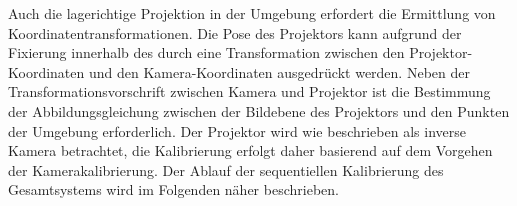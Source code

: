 Auch die lagerichtige Projektion in der Umgebung erfordert die Ermittlung von Koordinatentransformationen. Die Pose des Projektors kann aufgrund der Fixierung innerhalb des  durch eine Transformation zwischen den Projektor-Koordinaten und den Kamera-Koordinaten ausgedrückt werden. Neben der Transformationsvorschrift zwischen Kamera und Projektor ist die Bestimmung der Abbildungsgleichung zwischen der Bildebene des Projektors und den Punkten der Umgebung erforderlich. Der Projektor wird wie beschrieben als inverse Kamera betrachtet, die Kalibrierung erfolgt daher basierend auf dem Vorgehen der Kamerakalibrierung. Der Ablauf der sequentiellen Kalibrierung des Gesamtsystems wird im Folgenden näher beschrieben. 


